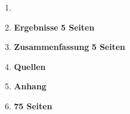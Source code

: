 \begin{framed}
\begin{enumerate}[label=\arabic*.]
    \item[]                                                             \dotfill
    
    \item   \textbf{Ergebnisse}                                         \dotfill \textbf{5 Seiten}
    \item   \textbf{Zusammenfassung}                                    \dotfill \textbf{5 Seiten}
    \item[] \textbf{Quellen}
    \item[] \textbf{Anhang}
    \item[]                                                             \hfill \textbf{75 Seiten}
\end{enumerate}
\end{framed}